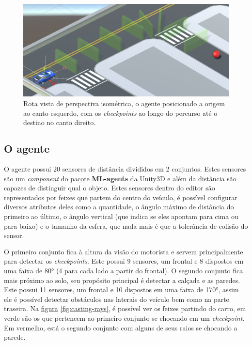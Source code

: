 \begin{figure}[h]
   \centering
   \includegraphics[scale=0.35]{figs/detalhe-rota.png}
    \caption{Rota vista de perspectiva isométrica, o agente posicionado a origem ao canto esquerdo, com os \textit{checkpoints} ao longo do percurso até o destino no canto direito.}
    \label{fig:route-view}
 \end{figure}

\subsection{O agente}\label{agent-subsection}
O agente possui 20 sensores de distância divididos em 2 conjuntos. Estes sensores são um \textit{component} do pacote \textbf{ML-agents} da Unity3D e além da distância são capazes de distinguir qual o objeto. Estes sensores dentro do editor são representados por feixes que partem do centro do veículo, é possível configurar diversos atributos deles como a quantidade, o ângulo máximo de distância do primeiro ao último, o ângulo vertical (que indica se eles apontam para cima ou para baixo) e o tamanho da esfera, que nada mais é que a tolerância de colisão do sensor.

O primeiro conjunto fica à altura da visão do motorista e servem principalmente para detectar os \textit{checkpoints}. Este possui 9 sensores, um frontal e 8 dispostos em uma faixa de 80° (4 para cada lado a partir do frontal). O segundo conjunto fica mais próximo ao solo, seu propósito principal é detectar a calçada e as paredes. Este possui 11 sensores, um frontal e 10 dispostos em uma faixa de 170°, assim ele é possível detectar obstáculos nas laterais do veículo bem como na parte traseira. Na \hyperref[fig:casting-rays]{figura} \ref{fig:casting-rays}, é possível ver os feixes partindo do carro, em verde são os que pertencem ao primeiro conjunto se chocando em um \textit{checkpoint}. Em vermelho, está o segundo conjunto com alguns de seus raios se chocando a parede.

